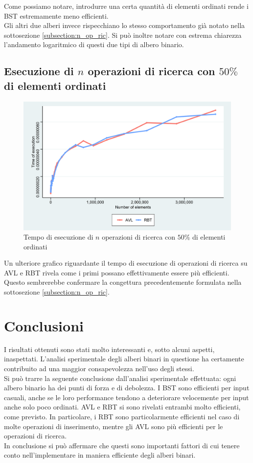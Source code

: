 \documentclass{article}
\begin{document}
	Come possiamo notare, introdurre una certa quantità di elementi ordinati rende i BST estremamente meno efficienti.\\
	Gli altri due alberi invece rispecchiano lo stesso comportamento già notato nella sottosezione \ref{subsection:n_op_ric}. Si può inoltre notare con estrema chiarezza l'andamento logaritmico di questi due tipi di albero binario.
	
	\newpage
	
	\subsection{Esecuzione di $n$ operazioni di ricerca con $50\%$ di elementi ordinati}
	
	\begin{figure}[h!]
		\centering
  		\includegraphics[width=1 \columnwidth]{Grafici/Grafico_All_find_ordered_AvlRbt.png}
  		\caption{Tempo di esecuzione di $n$ operazioni di ricerca con $50\%$ di elementi ordinati}
  		\label{fig:graph5}
	\end{figure}
	
	Un ulteriore grafico riguardante il tempo di esecuzione di operazioni di ricerca su AVL e RBT rivela come i primi possano effettivamente essere più efficienti. Questo sembrerebbe confermare la congettura precedentemente formulata nella sottosezione \ref{subsection:n_op_ric}.
	\newpage

	\section{Conclusioni}
	I risultati ottenuti sono stati molto interessanti e, sotto alcuni aspetti, inaspettati. L'analisi sperimentale degli alberi binari in questione ha certamente contribuito ad una maggior consapevolezza nell'uso degli stessi.
	\\
	Si può trarre la seguente conclusione dall'analisi sperimentale effettuata: ogni albero binario ha dei punti di forza e di debolezza. I BST sono efficienti per input casuali, anche se le loro performance tendono a deteriorare velocemente per input anche solo poco ordinati. AVL e RBT si sono rivelati entrambi molto efficienti, come previsto. In particolare, i RBT sono particolarmente efficienti nel caso di molte operazioni di inserimento, mentre gli AVL sono più efficienti per le operazioni di ricerca.\\
	
	In conclusione si può affermare che questi sono importanti fattori di cui tenere conto nell'implementare in maniera efficiente degli alberi binari.
	
\end{document}
